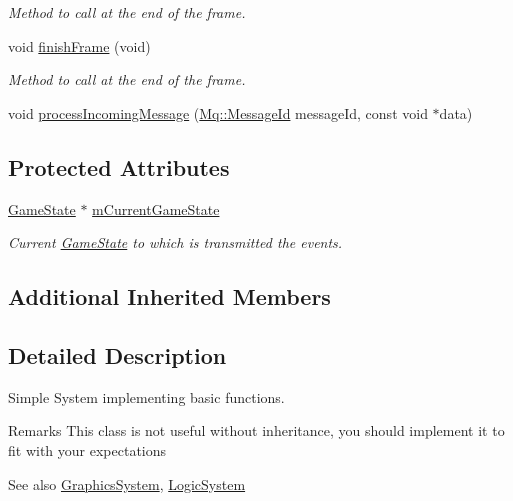 \begin{DoxyCompactItemize}
\begin{DoxyCompactList}\small\item\em Method to call at the end of the frame. \end{DoxyCompactList}\item 
\mbox{\label{class_common_1_1_base_system_ad8d31cde53383edccb40c3b986252f1c}} 
void \hyperlink{class_common_1_1_base_system_ad8d31cde53383edccb40c3b986252f1c}{finish\+Frame} (void)
\begin{DoxyCompactList}\small\item\em Method to call at the end of the frame. \end{DoxyCompactList}\item 
void \hyperlink{class_common_1_1_base_system_a6820dfed1ee63f376e5773b361e3d2a8}{process\+Incoming\+Message} (\hyperlink{group___common_gaa8c87d2b450282716c906da283e149e6}{Mq\+::\+Message\+Id} message\+Id, const void $\ast$data)
\end{DoxyCompactItemize}
\subsection*{Protected Attributes}
\begin{DoxyCompactItemize}
\item 
\hyperlink{class_common_1_1_game_state}{Game\+State} $\ast$ \hyperlink{class_common_1_1_base_system_a18e8e37eb4089bbde95459e16291b87a}{m\+Current\+Game\+State}
\begin{DoxyCompactList}\small\item\em Current \hyperlink{class_common_1_1_game_state}{Game\+State} to which is transmitted the events. \end{DoxyCompactList}\end{DoxyCompactItemize}
\subsection*{Additional Inherited Members}


\subsection{Detailed Description}
Simple System implementing basic functions. 

\begin{DoxyRemark}{Remarks}
This class is not useful without inheritance, you should implement it to fit with your expectations 
\end{DoxyRemark}
\begin{DoxySeeAlso}{See also}
\hyperlink{class_common_1_1_graphics_system}{Graphics\+System}, \hyperlink{class_common_1_1_logic_system}{Logic\+System} 
\end{DoxySeeAlso}


